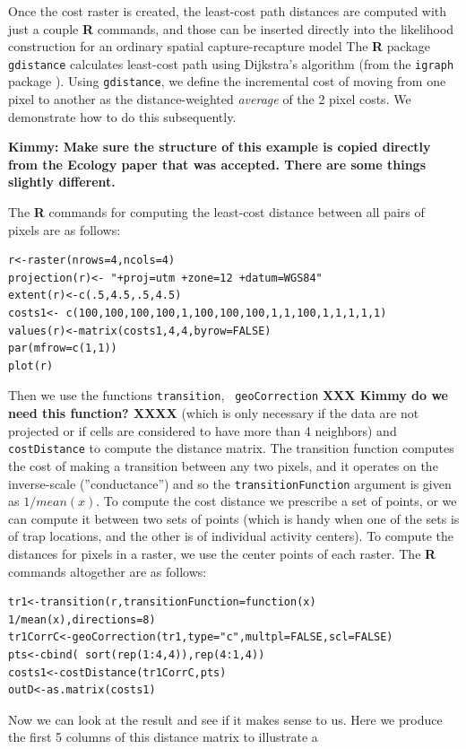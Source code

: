 Once the cost raster is created, the least-cost path distances are
computed with just a couple {\bf R} commands, and those can be
inserted directly into the likelihood construction for an ordinary
spatial capture-recapture model The {\bf R} package
\mbox{\tt gdistance} calculates least-cost path using  Dijkstra's algorithm
\citep{dijkstra:1959} (from the \mbox{\tt igraph} package
\citep{csardi:2010}).  Using \mbox{\tt gdistance}, we
define the incremental cost of moving from one pixel to another as the
distance-weighted {\it average} of the 2 pixel costs. We demonstrate
how to do this subsequently.

{\bf Kimmy: Make sure the structure of this example is copied directly
from the Ecology paper that was accepted. There are some things
slightly
different.}

The {\bf R} commands for computing the least-cost distance between all pairs of pixels
are as follows:
\begin{verbatim}
r<-raster(nrows=4,ncols=4)
projection(r)<- "+proj=utm +zone=12 +datum=WGS84"
extent(r)<-c(.5,4.5,.5,4.5)
costs1<- c(100,100,100,100,1,100,100,100,1,1,100,1,1,1,1,1)
values(r)<-matrix(costs1,4,4,byrow=FALSE)
par(mfrow=c(1,1))
plot(r)
\end{verbatim}
Then we use the functions \mbox{\tt transition}, \mbox{\tt
  geoCorrection} {\bf XXX Kimmy do we need this function? XXXX}
 (which is only necessary if the data are not
projected or if cells are considered to have more than 4 neighbors)
 and \mbox{\tt costDistance} to compute the distance
matrix. The transition function computes the cost of making a
transition between
any two pixels, and it operates on the inverse-scale (''conductance'')
and so the
\mbox{\tt transitionFunction} argument is given as $1/mean(x)$.
To compute the cost distance we prescribe a set of points, or  we
can compute it  between
two sets of points (which is handy when one of the sets is of trap
locations, and the other is of individual activity centers).
To compute the distances for pixels in a raster,
we use the center points of each raster.  The {\bf R}
 commands altogether are as follows:
{\small
\begin{verbatim}
tr1<-transition(r,transitionFunction=function(x) 1/mean(x),directions=8)
tr1CorrC<-geoCorrection(tr1,type="c",multpl=FALSE,scl=FALSE)
pts<-cbind( sort(rep(1:4,4)),rep(4:1,4))
costs1<-costDistance(tr1CorrC,pts)
outD<-as.matrix(costs1)
\end{verbatim}
}
Now we can look at the result and see if it makes sense to us. Here we
produce the first 5 columns of this distance matrix to illustrate a
